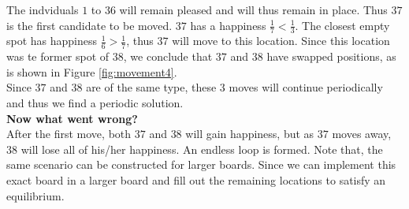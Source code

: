 The indviduals \(1\) to \(36\) will remain pleased and will thus remain in place. 
Thus $37$ is the first candidate to be moved. $37$ has a happiness $\frac{1}{7} < \frac{1}{3}$. 
The closest empty spot has happiness $\frac{1}{6} > \frac{1}{7}$, thus $37$ will move to this location. 
Since this location was te former spot of \(38\), we conclude that  $37$ and $38$ have swapped positions, as is shown in Figure \ref{fig:movement4}.\\
Since $37$ and $38$ are of the same type, these $3$ moves will continue periodically and thus we find a periodic solution.\\

\textbf{Now what went wrong?} \\
After the first move, both $37$ and $38$ will gain happiness, but as \(37\) moves away, $38$ will lose all of his/her happiness. 
An endless loop is formed.
Note that, the same scenario can be constructed for larger boards. 
Since we can implement this exact board in a larger board and fill out the remaining locations to satisfy an equilibrium.
